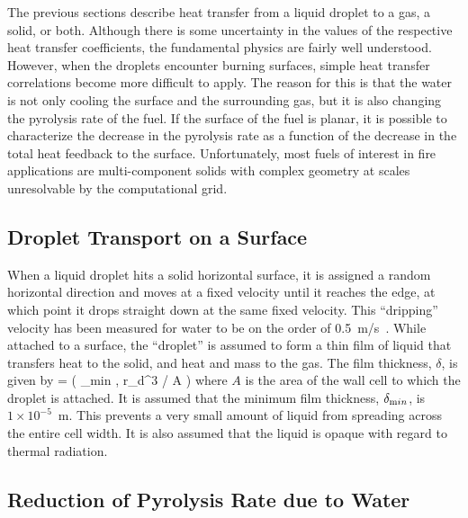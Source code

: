The previous sections describe heat transfer from a liquid droplet to a gas, a solid, or both. Although there is some
uncertainty in the values of the respective heat transfer coefficients,
the fundamental physics are fairly well understood. However, when
the droplets encounter burning surfaces,
simple heat transfer correlations become more difficult to apply.
The reason for this is that the water is not only cooling the surface
and the surrounding gas, but it is also changing the pyrolysis rate
of the fuel. If the surface of the fuel is planar, it is possible
to characterize the decrease in the pyrolysis rate as a function of
the decrease in the total heat feedback to the surface. Unfortunately,
most fuels of interest in fire applications are multi-component solids
with complex geometry at scales unresolvable by the computational grid.

\subsection{Droplet Transport on a Surface}

When a liquid droplet hits a solid horizontal surface, it is assigned a
random horizontal direction and moves at a fixed velocity until it
reaches the edge, at which point it drops straight down at the same
fixed velocity. This ``dripping'' velocity has been measured for water to be on
the order of 0.5~m/s~\cite{Hamins:1,Hamins:IAFSS2002}.
While attached to a surface, the ``droplet'' is assumed to form a thin film of liquid that
transfers heat to the solid, and heat and mass to
the gas. The film thickness, $\delta$, is given by
\be
   \delta = \max \left( \delta_{\text min} , \sum {} \pi r_d^3 / A \right)
\ee
where $A$ is the area of the wall cell to which the droplet is attached. 
It is assumed that the minimum film thickness, $\delta_{\text min}$, is $1 \times 10^{-5}$~m. This prevents a very small amount of liquid from spreading across the entire cell width. It is also assumed that the liquid is opaque with regard to thermal radiation.

\subsection{Reduction of Pyrolysis Rate due to Water}

